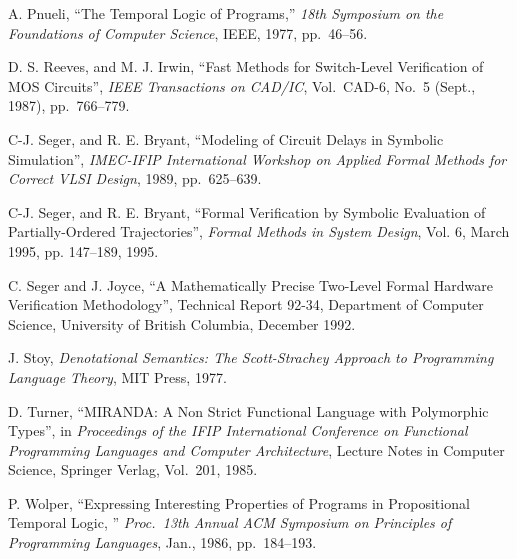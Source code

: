 \begin{thebibliography}{99}
A. Pnueli,
``The Temporal Logic of Programs,''
{\em 18th Symposium on the Foundations of Computer Science},
IEEE, 1977, pp.~46--56.

D. S. Reeves, and M. J. Irwin,
``Fast Methods for Switch-Level Verification of MOS Circuits'',
{\it IEEE Transactions on CAD/IC},
Vol.~CAD-6, No.~5 (Sept., 1987), pp.~766--779.

C-J. Seger, and R. E. Bryant,
``Modeling of Circuit Delays in Symbolic Simulation'',
{\it IMEC-IFIP International Workshop on Applied Formal Methods for Correct
VLSI Design}, 1989, pp.~625--639.

C-J. Seger, and R. E. Bryant, ``Formal Verification by Symbolic Evaluation
of Partially-Ordered Trajectories'', {\it Formal Methods in System Design},
Vol. 6, March 1995, pp. 147--189, 1995.

C. Seger and J. Joyce, ``A Mathematically Precise Two-Level Formal Hardware
Verification Methodology'', Technical Report 92-34, Department of Computer
Science, University of British Columbia, December 1992.


J. Stoy, {\it Denotational Semantics: The Scott-Strachey Approach to
Programming Language Theory}, MIT Press, 1977.

D. Turner, ``MIRANDA: A Non Strict Functional Language with Polymorphic Types'',
in {\it Proceedings of the IFIP International Conference on Functional Programming Languages and Computer Architecture}, Lecture Notes in Computer Science,
Springer Verlag, Vol.~201, 1985.

P. Wolper,
``Expressing Interesting Properties of Programs in Propositional Temporal Logic,
''
{\em Proc.~13th Annual ACM Symposium on Principles of Programming Languages},
Jan., 1986, pp.~184--193.

\end{thebibliography}

